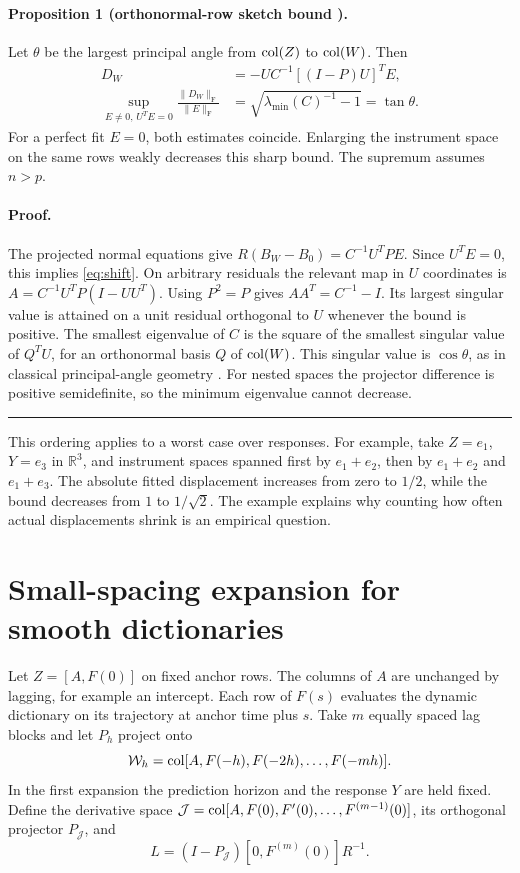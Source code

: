 \documentclass[11pt,a4paper]{article}
\newcommand{\RR}{\mathbb R}
\newcommand{\col}{\mathop{\rm col}}
\newcommand{\F}{\mathrm F}
\begin{document}
\paragraph{Proposition 1 (orthonormal-row sketch bound \cite{chi}).} Let $\theta$ be the largest principal angle from $\col(Z)$ to $\col(W)$. Then
\begin{align}
 D_W &= -U C^{-1} [(I-P)U]^T E, \label{eq:shift}\\
 \sup_{E\ne0,\, U^T E=0} \frac{\|D_W\|_{\F}}{\|E\|_{\F}}
 &=\sqrt{\lambda_{\min}(C)^{-1}-1}=\tan\theta. \label{eq:bound}
\end{align}
For a perfect fit $E=0$, both estimates coincide. Enlarging the instrument space on the same rows weakly decreases this sharp bound. The supremum assumes $n>p$.

\paragraph{Proof.} The projected normal equations give $R(B_W-B_0)=C^{-1}U^TPE$. Since $U^TE=0$, this implies \eqref{eq:shift}. On arbitrary residuals the relevant map in $U$ coordinates is $A=C^{-1}U^TP(I-UU^T)$. Using $P^2=P$ gives $AA^T=C^{-1}-I$. Its largest singular value is attained on a unit residual orthogonal to $U$ whenever the bound is positive. The smallest eigenvalue of $C$ is the square of the smallest singular value of $Q^TU$, for an orthonormal basis $Q$ of $\col(W)$. This singular value is $\cos\theta$, as in classical principal-angle geometry \cite{angles}. For nested spaces the projector difference is positive semidefinite, so the minimum eigenvalue cannot decrease. \hfill\rule{1ex}{1ex}

This ordering applies to a worst case over responses. For example, take $Z=e_1$, $Y=e_3$ in $\RR^3$, and instrument spaces spanned first by $e_1+e_2$, then by $e_1+e_2$ and $e_1+e_3$. The absolute fitted displacement increases from zero to $1/2$, while the bound decreases from $1$ to $1/\sqrt{2}$. The example explains why counting how often actual displacements shrink is an empirical question.


\section{Small-spacing expansion for smooth dictionaries}
Let $Z=[A,F(0)]$ on fixed anchor rows. The columns of $A$ are unchanged by lagging, for example an intercept. Each row of $F(s)$ evaluates the dynamic dictionary on its trajectory at anchor time plus $s$. Take $m$ equally spaced lag blocks and let $P_h$ project onto
\[
 \mathcal W_h=\col[A,F(-h),F(-2h),\ldots,F(-mh)].
\]
In the first expansion the prediction horizon and the response $Y$ are held fixed. Define the derivative space
$\mathcal J=\col[A,F(0),F'(0),\ldots,F^{(m-1)}(0)]$, its orthogonal projector $P_{\mathcal J}$, and
\[
 L=(I-P_{\mathcal J})[0,F^{(m)}(0)]R^{-1}.
\]
\end{document}
